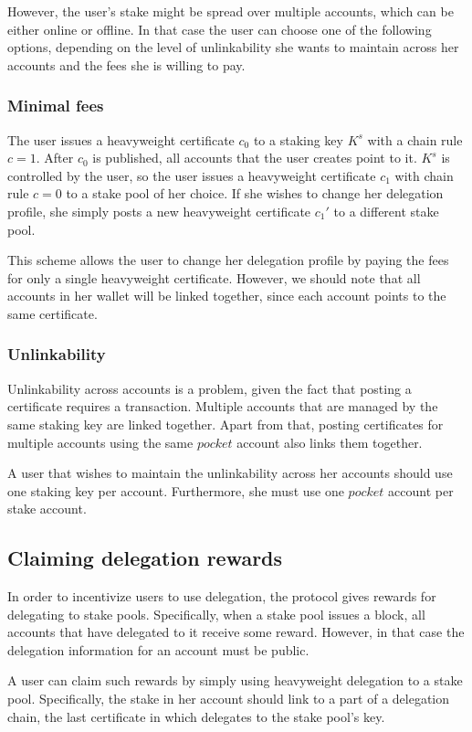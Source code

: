 However, the user's stake might be spread over multiple accounts, which can be either online or offline. In that case the user can choose one of the following options, depending on the level of unlinkability she wants to maintain across her accounts and the fees she is willing to pay.

\subsubsection{Minimal fees}

The user issues a heavyweight certificate $c_0$ to a staking key $K^s$ with a chain rule $c = 1$. After $c_0$ is published, all accounts that the user creates point to it. $K^s$ is controlled by the user, so the user issues a heavyweight certificate $c_1$ with chain rule $c = 0$ to a stake pool of her choice. If she wishes to change her delegation profile, she simply posts a new heavyweight certificate ${c_1}'$ to a different stake pool.

This scheme allows the user to change her delegation profile by paying the fees for only a single heavyweight certificate. However, we should note that all accounts in her wallet will be linked together, since each account points to the same certificate.

\subsubsection{Unlinkability}

Unlinkability across accounts is a problem, given the fact that posting a certificate requires a transaction. Multiple accounts that are managed by the same staking key are linked together. Apart from that, posting certificates for multiple accounts using the same $pocket$ account also links them together.

A user that wishes to maintain the unlinkability across her accounts should use one staking key per account. Furthermore, she must use one $pocket$ account per stake account.

\subsection{Claiming delegation rewards}

In order to incentivize users to use delegation, the protocol gives rewards for delegating to stake pools. Specifically, when a stake pool issues a block, all accounts that have delegated to it receive some reward. However, in that case the delegation information for an account must be public.

A user can claim such rewards by simply using heavyweight delegation to a stake pool. Specifically, the stake in her account should link to a part of a delegation chain, the last certificate in which delegates to the stake pool's key.

